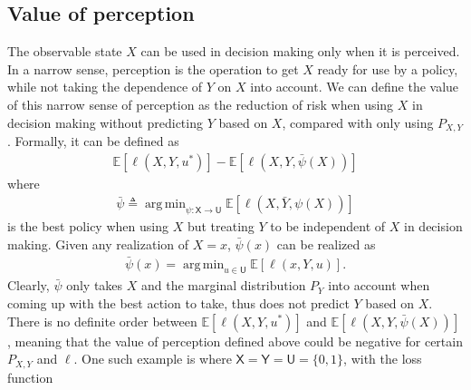 \documentclass{article}
\newcommand{\E}{\mathbb{E}}
\DeclareMathOperator*{\argmin}{arg\,min}
\def\sU{{\mathsf U}}
\def\sX{{\mathsf X}}
\def\sY{{\mathsf Y}}
\def\deq{\triangleq}
\begin{document}
 \subsection{Value of perception}
The observable state $X$ can be used in decision making only when it is perceived. In a narrow sense, perception is the operation to get $X$ ready for use by a policy, while not taking the dependence of $Y$ on $X$ into account. We can define the value of this narrow sense of perception as the reduction of risk when using $X$ in decision making without predicting $Y$ based on $X$, compared with only using $P_{X,Y}$. Formally, it can be defined as
\begin{align}\label{eq:vopercep_def}
		 \E[\ell(X,Y,u^*)] - \E[\ell(X,Y,\bar\psi(X))] 
	\end{align}
where
\begin{align}\label{eq:psibar_def}
\bar\psi\deq\argmin_{\psi:\sX\rightarrow\sU} \E[\ell(X,\bar Y,\psi(X))]
\end{align}
is the best policy when using $X$ but treating $Y$ to be independent of $X$ in decision making.
Given any realization of $X=x$, $\bar\psi(x)$ can be realized as 
\begin{align}
\bar\psi(x) = \argmin_{u\in\sU}\E[\ell(x,Y,u)] .
\end{align}
Clearly, $\bar\psi$ only takes $X$ and the marginal distribution $P_Y$ into account when coming up with the best action to take, thus does not predict $Y$ based on $X$.
There is no definite order between $\E[\ell(X,Y,u^*)]$ and $\E[\ell(X,Y,\bar\psi(X))]$, meaning that the value of perception defined above could be negative for certain $P_{X,Y}$ and $\ell$. 
One such example is where $\sX = \sY = \sU = \{0,1\}$, with the loss function 
\end{document}
